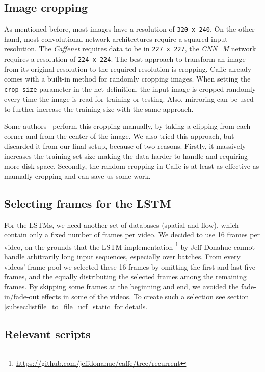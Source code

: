 \subsection{Image cropping}
As mentioned before, most images have a resolution of \texttt{320 x 240}.
On the other hand, most convolutional network architectures require a squared input resolution.
The \emph{Caffenet} requires data to be in \texttt{227 x 227}, the \emph{CNN\_M} network requires a resolution of \texttt{224 x 224}.
The best approach to transform an image from its original resolution to the required resolution is cropping.
Caffe already comes with a built-in method for randomly cropping images.
When setting the \texttt{crop\_size} parameter in the net definition, the input image is cropped randomly every time the image is read for training or testing.
Also, mirroring can be used to further increase the training size with the same approach.

Some authors~\cite{ye2015evaluating} perform this cropping manually, by taking a clipping from each corner and from the center of the image.
We also tried this approach, but discarded it from our final setup, because of two reasons.
Firstly, it massively increases the training set size making the data harder to handle and requiring more disk space.
Secondly, the random cropping in Caffe is at least as effective as manually cropping and can save us some work.

\subsection{Selecting frames for the LSTM}
For the LSTMs, we need another set of databases (spatial and flow), which contain only a fixed number of frames per video.
We decided to use 16 frames per video, on the grounds that the LSTM implementation \footnote{\url{https://github.com/jeffdonahue/caffe/tree/recurrent}} by Jeff Donahue cannot handle arbitrarily long input sequences, especially over batches.
From every videos' frame pool we selected these 16 frames by omitting the first and last five frames, and the equally distributing the selected frames among the remaining frames.
By skipping some frames at the beginning and end, we avoided the fade-in/fade-out effects in some of the videos. To create such a selection see section \ref{subsec:listfile_to_file_ucf_static} for details.

\subsection{Relevant scripts}

